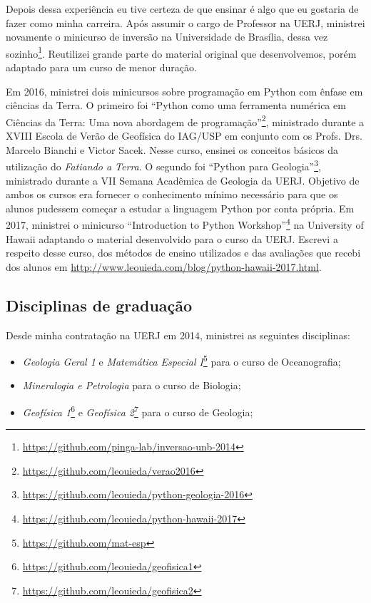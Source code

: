 Depois dessa experiência eu tive certeza de que ensinar é algo que eu gostaria
de fazer como minha carreira.
Após assumir o cargo de Professor na UERJ, ministrei novamente o minicurso de
inversão na Universidade de Brasília, dessa vez
sozinho\footnote{\url{https://github.com/pinga-lab/inversao-unb-2014}}.
Reutilizei grande parte do material original que desenvolvemos, porém adaptado
para um curso de menor duração.

Em 2016, ministrei dois minicursos sobre programação em Python com ênfase em
ciências da Terra.
O primeiro foi ``Python como uma ferramenta numérica em Ciências da
Terra: Uma nova abordagem de
programação''\footnote{\url{https://github.com/leouieda/verao2016}}, ministrado
durante
a XVIII Escola de Verão de Geofísica do IAG/USP em conjunto com os Profs. Drs.
Marcelo Bianchi e Victor Sacek.
Nesse curso, ensinei os conceitos básicos da utilização do \textit{Fatiando a
Terra}.
O segundo foi ``Python para
Geologia''\footnote{\url{https://github.com/leouieda/python-geologia-2016}},
ministrado durante a
VII Semana Acadêmica de Geologia da UERJ.
Objetivo de ambos os cursos era fornecer o conhecimento mínimo necessário para
que os alunos pudessem começar a estudar a linguagem Python por conta própria.
Em 2017, ministrei o minicurso ``Introduction to Python
Workshop''\footnote{\url{https://github.com/leouieda/python-hawaii-2017}} na
University of Hawaii adaptando o material desenvolvido para o curso da UERJ.
Escrevi a respeito desse curso, dos métodos de ensino utilizados e das
avaliações que recebi dos alunos em
\url{http://www.leouieda.com/blog/python-hawaii-2017.html}.


\subsection{Disciplinas de graduação}

Desde minha contratação na UERJ em 2014, ministrei as seguintes disciplinas:

\begin{itemize}
    \item \textit{Geologia Geral 1} e \textit{Matemática Especial
        I}\footnote{\url{https://github.com/mat-esp}} para o curso de
        Oceanografia;
    \item \textit{Mineralogia e Petrologia} para o curso de Biologia;
    \item \textit{Geofísica
        1}\footnote{\url{https://github.com/leouieda/geofisica1}} e
        \textit{Geofísica
        2}\footnote{\url{https://github.com/leouieda/geofisica2}} para o curso
        de Geologia;
\end{itemize}

